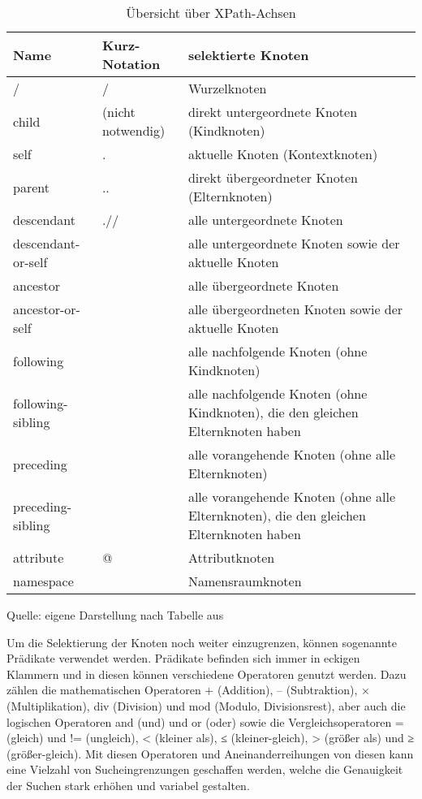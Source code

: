 \begin{table}[H]
    \centering
    \begin{tabular}{|l|l|p{8cm}|} %
        \hline
        \textbf{Name} & \textbf{Kurz-Notation} & \textbf{selektierte Knoten} \\
        \hline
        / & / & Wurzelknoten \\
        \hline
        child & (nicht notwendig) & direkt untergeordnete Knoten (Kindknoten) \\
        \hline
        self & . & aktuelle Knoten (Kontextknoten) \\
        \hline
        parent & .. & direkt übergeordneter Knoten (Elternknoten) \\
        \hline
        descendant & .// & alle untergeordnete Knoten \\
        \hline
        descendant-or-self &  & alle untergeordnete Knoten sowie der aktuelle Knoten \\
        \hline
        ancestor &  & alle übergeordnete Knoten \\
        \hline
        ancestor-or-self &  & alle übergeordneten Knoten sowie der aktuelle Knoten \\
        \hline
        following &  & alle nachfolgende Knoten (ohne Kindknoten) \\
        \hline
        following-sibling &  & alle nachfolgende Knoten (ohne Kindknoten), die den gleichen Elternknoten haben \\
        \hline
        preceding &  & alle vorangehende Knoten (ohne alle Elternknoten) \\
        \hline
        preceding-sibling &  & alle vorangehende Knoten (ohne alle Elternknoten), die den gleichen Elternknoten haben \\
        \hline
        attribute & @ & Attributknoten \\
        \hline
        namespace &  & Namensraumknoten \\
        \hline
    \end{tabular}
    \caption{Übersicht über XPath-Achsen}
    \label{tab:Übersicht über XPath-Achsen}
    \vspace{0.2cm}
    {\small Quelle: eigene Darstellung nach Tabelle aus \cite*{XPath2025}}
\end{table}


Um die Selektierung der Knoten noch weiter einzugrenzen, können sogenannte Prädikate verwendet werden.
Prädikate befinden sich immer in eckigen Klammern und in diesen können verschiedene Operatoren genutzt werden.
Dazu zählen die mathematischen Operatoren + (Addition), – (Subtraktion), × (Multiplikation), div (Division) und mod (Modulo, Divisionsrest),
aber auch die logischen Operatoren and (und) und or (oder) sowie die Vergleichsoperatoren = (gleich) und != (ungleich),
< (kleiner als), ≤ (kleiner-gleich), > (größer als) und ≥ (größer-gleich).
Mit diesen Operatoren und Aneinanderreihungen von diesen kann eine Vielzahl von Sucheingrenzungen geschaffen werden,
welche die Genauigkeit der Suchen stark erhöhen und variabel gestalten. \cite{XPath2025}


